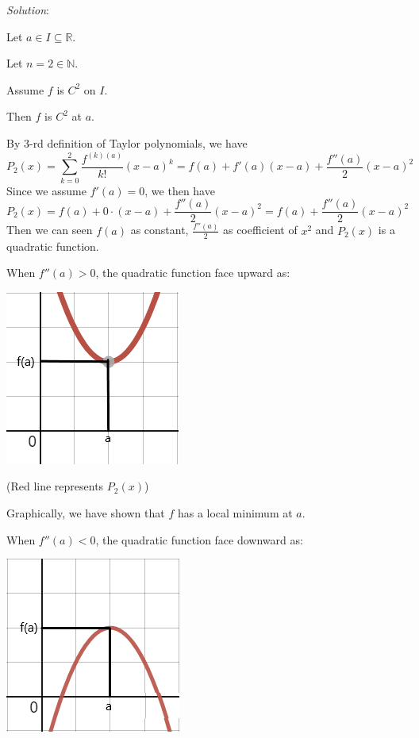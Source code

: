 \documentclass[12pt]{exam}
\newcommand{\R}{\mathbb{R}}
\newcommand{\N}{\mathbb{N}}
\begin{document}
\begin{enumerate}
\begin{enumerate}
			\emph{Solution}:
			
			Let $a \in I\subseteq\R$.
			
			Let $n=2\in\N$.
			
			Assume $f$ is $C^2$ on $I$.
			
			Then $f$ is $C^2$ at $a$.
			
			By 3-rd definition of Taylor polynomials, we have
			$$
			    P_2(x)=\sum_{k=0}^2 \frac{f^{(k)(a)}}{k!}(x-a)^k=f(a)+f'(a)(x-a)+\frac{f''(a)}{2}(x-a)^2
			$$
			Since we assume $f'(a) = 0$, we then have
			$$
			    P_2(x)=f(a)+0\cdot(x-a)+\frac{f''(a)}{2}(x-a)^2=f(a)+\frac{f''(a)}{2}(x-a)^2
			$$
			Then we can seen $f(a)$ as constant, $\frac{f''(a)}{2}$ as coefficient of $x^2$ and $P_2(x)$ is a quadratic function.
			
			When $f''(a)>0$, the quadratic function face upward as:
			\begin{center}
			    \includegraphics[scale=0.75]{Upward}
			    
			    (Red line represents $P_2(x)$)
			\end{center}
			Graphically, we have shown that $f$ has a local minimum at $a$.
			
			\newpage
			
			When $f''(a)<0$, the quadratic function face downward as:
			\begin{center}
			    \includegraphics[scale=0.75]{Downward}
			    

\end{center}
\end{enumerate}
\end{enumerate}
\end{document}
